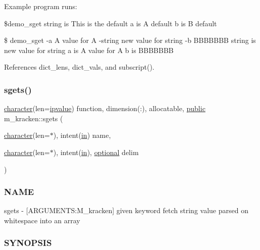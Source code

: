 Example program runs\+:

\$demo\+\_\+sget string is This is the default a is A default b is B default

\$ demo\+\_\+sget -\/a A value for A -\/string new value for string -\/b B\+B\+B\+B\+B\+BB string is new value for string a is A value for A b is B\+B\+B\+B\+B\+BB 

References dict\+\_\+lens, dict\+\_\+vals, and subscript().

\mbox{\label{namespacem__kracken_a8ae60c1a9c903c8ad06ef1f95975d457}} 
\subsubsection{\texorpdfstring{sgets()}{sgets()}}
{\footnotesize\ttfamily \hyperlink{option__stopwatch_83_8txt_abd4b21fbbd175834027b5224bfe97e66}{character}(len=\hyperlink{namespacem__kracken_a9e71724677cede703e1fb186e446349f}{ipvalue}) function, dimension(\+:), allocatable, \hyperlink{M__stopwatch_83_8txt_a2f74811300c361e53b430611a7d1769f}{public} m\+\_\+kracken\+::sgets (\begin{DoxyParamCaption}\item[{\hyperlink{option__stopwatch_83_8txt_abd4b21fbbd175834027b5224bfe97e66}{character}(len=$\ast$), intent(\hyperlink{M__journal_83_8txt_afce72651d1eed785a2132bee863b2f38}{in})}]{name,  }\item[{\hyperlink{option__stopwatch_83_8txt_abd4b21fbbd175834027b5224bfe97e66}{character}(len=$\ast$), intent(\hyperlink{M__journal_83_8txt_afce72651d1eed785a2132bee863b2f38}{in}), \hyperlink{option__stopwatch_83_8txt_aa4ece75e7acf58a4843f70fe18c3ade5}{optional}}]{delim }\end{DoxyParamCaption})}



\subsubsection*{N\+A\+ME}

sgets -\/ \mbox{[}A\+R\+G\+U\+M\+E\+N\+TS\+:M\+\_\+kracken\mbox{]} given keyword fetch string value parsed on whitespace into an array \subsubsection*{S\+Y\+N\+O\+P\+S\+IS}

